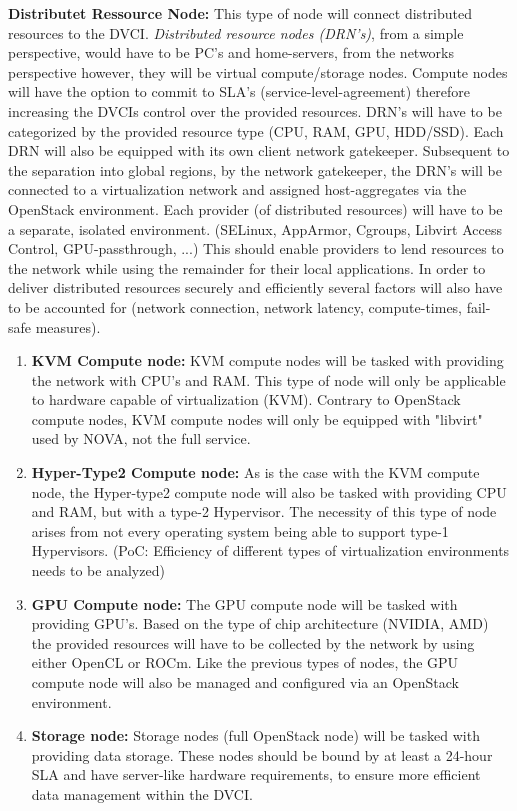 \documentclass[]{article}
\begin{document}
\textbf{Distributet Ressource Node:}
This type of node will connect distributed resources to the DVCI. 
\textit{Distributed resource nodes (DRN's)}, from a simple perspective, would have to be PC's and home-servers, from the networks perspective however, they will be virtual compute/storage nodes.
Compute nodes will have the option to commit to SLA's (service-level-agreement) therefore increasing the DVCIs control over the provided resources.
DRN's will have to be categorized by the provided resource type (CPU, RAM, GPU, HDD/SSD).
Each DRN will also be equipped with its own client network gatekeeper.
Subsequent to the separation into global regions, by the network gatekeeper, the DRN's will be connected to a virtualization network and assigned host-aggregates via the OpenStack environment.
Each provider (of distributed resources) will have to be a separate, isolated environment. (SELinux, AppArmor, Cgroups, Libvirt Access Control, GPU-passthrough, ...) 
This should enable providers to lend resources to the network while using the remainder for their local applications. 
In order to deliver distributed resources securely and efficiently several factors will also have to be accounted for (network connection, network latency, compute-times, fail-safe measures).  

\begin{enumerate}[label=\textbullet]
	\item \textbf{KVM Compute node:}
    KVM compute nodes will be tasked with providing the network with CPU's and RAM. 
    This type of node will only be applicable to hardware capable of virtualization (KVM).
    Contrary to OpenStack compute nodes, KVM compute nodes will only be equipped with "libvirt" used by NOVA, not the full service. 
			
	\item \textbf{Hyper-Type2 Compute node:}
	As is the case with the KVM compute node, the Hyper-type2 compute node will also be tasked with providing CPU and RAM, but with a type-2 Hypervisor.
	The necessity of this type of node arises from not every operating system being able to support type-1 Hypervisors.
	(PoC: Efficiency of different types of virtualization environments needs to be analyzed) 
	
	\item \textbf{GPU Compute node:}
	The GPU compute node will be tasked with providing GPU's.
	Based on the type of chip architecture (NVIDIA, AMD) the provided resources will have to be collected by the network by using either OpenCL or ROCm.
	Like the previous types of nodes, the GPU compute node will also be managed and configured via an OpenStack environment. 
		
	\item \textbf{Storage node:}
	Storage nodes (full OpenStack node) will be tasked with providing data storage. 
	These nodes should be bound by at least a 24-hour SLA and have server-like hardware requirements, to ensure more efficient data management within the DVCI.  
\end{enumerate}
\end{document}
